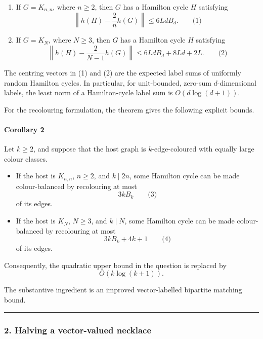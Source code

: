 \documentclass[
  11pt,
  a4paper,
]{article}
\begin{document}
\begin{enumerate}
\def\labelenumi{\arabic{enumi}.}
\item
  If \(G=K_{n,n}\), where \(n\ge2\), then \(G\) has a Hamilton cycle
  \(H\) satisfying \[
  \left\|h(H)-\frac2n h(G)\right\|
  \le 6LdB_d.
  \qquad\text{(1)}
  \]
\item
  If \(G=K_N\), where \(N\ge3\), then \(G\) has a Hamilton cycle \(H\)
  satisfying \[
  \left\|h(H)-\frac{2}{N-1}h(G)\right\|
  \le 6LdB_d+8Ld+2L.
  \qquad\text{(2)}
  \]
\end{enumerate}

The centring vectors in (1) and (2) are the expected label sums of
uniformly random Hamilton cycles. In particular, for unit-bounded,
zero-sum \(d\)-dimensional labels, the least norm of a Hamilton-cycle
label sum is \(O(d\log(d+1))\).

For the recolouring formulation, the theorem gives the following
explicit bounds.

\paragraph{Corollary 2}\label{corollary-2}

Let \(k\ge2\), and suppose that the host graph is \(k\)-edge-coloured
with equally large colour classes.

\begin{itemize}
\item
  If the host is \(K_{n,n}\), \(n\ge2\), and \(k\mid 2n\), some Hamilton
  cycle can be made colour-balanced by recolouring at most \[
  3kB_k
  \qquad\text{(3)}
  \] of its edges.
\item
  If the host is \(K_N\), \(N\ge3\), and \(k\mid N\), some Hamilton
  cycle can be made colour-balanced by recolouring at most \[
  3kB_k+4k+1
  \qquad\text{(4)}
  \] of its edges.
\end{itemize}

Consequently, the quadratic upper bound in the question is replaced by
\[
\boxed{O(k\log(k+1)).}
\]

The substantive ingredient is an improved vector-labelled bipartite
matching bound.

\begin{center}\rule{0.5\linewidth}{0.5pt}\end{center}

\subsubsection{2. Halving a vector-valued
necklace}\label{halving-a-vector-valued-necklace}
\end{document}
